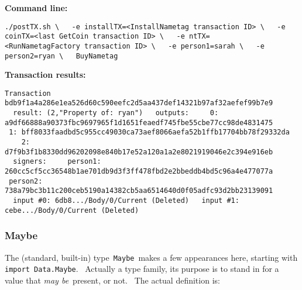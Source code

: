 \documentclass[11pt]{article}
\newcommand{\codeblock}[1]{\begin{mdframed}[
    backgroundcolor=header-color,
    linecolor=header-color,
    innertopmargin=10pt,
    ]{\texttt{#1}}\end{mdframed}}
\begin{document}
\textbf{Command line:}

\codeblock{.\slash{}postTX.sh \textbackslash{}\newline
  -e installTX=\textless{}InstallNametag transaction ID\textgreater{} \textbackslash{}\newline
  -e coinTX=\textless{}last GetCoin transaction ID\textgreater{} \textbackslash{}\newline
  -e ntTX=\textless{}RunNametagFactory transaction ID\textgreater{} \textbackslash{}\newline
  -e person1=sarah \textbackslash{}\newline
  -e person2=ryan \textbackslash{}\newline
  BuyNametag}

\textbf{Transaction results:}

\codeblock{Transaction bdb9f1a4a286e1ea526d60c590eefc2d5aa437def14321b97af32aefef99b7e9\newline
  result: (2,"Property of: ryan")\newline
  outputs:\newline
    0: a9df66888a90373fbc9697965f1d1651feaedf745fbe55cbe77cc98de4831475\newline
    1: bff8033faadbd5c955cc49030ca73aef8066aefa52b1ffb17704bb78f29332da\newline
    2: d7f9b3f1b8330dd96202098e840b17e52a120a1a2e8021919046e2c394e916eb\newline
  signers:\newline
    person1: 260cc5cf5cc36548b1ae701db9d3f3ff478fbd2e2bbeddb4bd5c96a4e477077a\newline
    person2: 738a79bc3b11c200ceb5190a14382cb5aa6514640d0f05adfc93d2bb23139091\newline
  input \#0: 6db8...\slash{}Body\slash{}0\slash{}Current (Deleted)\newline
  input \#1: cebe...\slash{}Body\slash{}0\slash{}Current (Deleted)}

\subsubsection{Maybe}
\vspace{5.5pt}

The (standard, built-in) type \texttt{Maybe} makes a few appearances here, starting with \texttt{import Data.Maybe}.  Actually a type family, its purpose is to stand in for a value that \textit{may be} present, or not.  The actual definition is:
\end{document}
